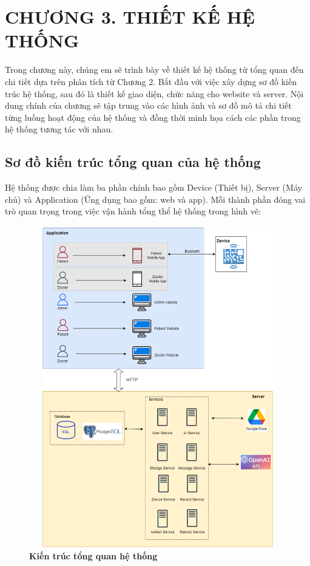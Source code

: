 
\section*{CHƯƠNG 3. THIẾT KẾ HỆ THỐNG}
\setcounter{section}{3}
\setcounter{subsection}{0} %
\setcounter{table}{0} %
\setcounter{figure}{0} %

Trong chương này, chúng em sẽ trình bày về thiết kế hệ thống từ tổng quan đến chi tiết dựa trên phân tích từ Chương 2. Bắt đầu với việc xây dựng sơ đồ kiến trúc hệ thống,
sau đó là thiết kế giao diện, chức năng cho website và server. Nội dung chính của chương sẽ tập trung vào các hình
ảnh và sơ đồ mô tả chi tiết từng luồng hoạt động của hệ thống và đồng thời minh họa cách các phần trong hệ thống tương tác với nhau.

\subsection{Sơ đồ kiến trúc tổng quan của hệ thống}
Hệ thống được chia làm ba phần chính bao gồm Device (Thiết bị), Server (Máy chủ) và Application (Ứng dụng bao gồm: web và app). Mỗi thành phần đóng vai trò quan trọng trong việc vận hành tổng thể hệ thống trong hình vẽ:

\begin{figure}[H]
  \centering
  \includegraphics[width=12cm,height=14cm]{Images/system/fmECG_architecture-System_Architecture.png}
  \caption[Kiến trúc tổng quan hệ thống]{\bfseries \fontsize{12pt}{0pt}\selectfont Kiến trúc tổng quan hệ thống}
  \label{fmECG_architecture-System} %
\end{figure}

